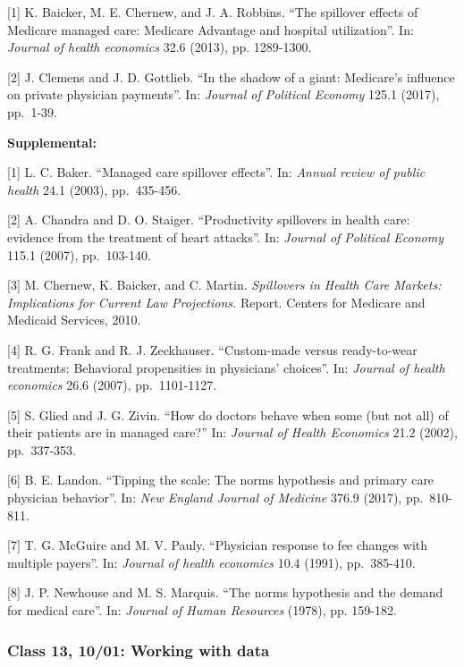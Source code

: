 \documentclass[11pt,]{article}
\begin{document}
{[}1{]} K. Baicker, M. E. Chernew, and J. A. Robbins. ``The spillover
effects of Medicare managed care: Medicare Advantage and hospital
utilization''. In: \emph{Journal of health economics} 32.6 (2013), pp.
1289-1300.

{[}2{]} J. Clemens and J. D. Gottlieb. ``In the shadow of a giant:
Medicare's influence on private physician payments''. In: \emph{Journal
of Political Economy} 125.1 (2017), pp.~1-39.

\textbf{Supplemental:}

{[}1{]} L. C. Baker. ``Managed care spillover effects''. In:
\emph{Annual review of public health} 24.1 (2003), pp.~435-456.

{[}2{]} A. Chandra and D. O. Staiger. ``Productivity spillovers in
health care: evidence from the treatment of heart attacks''. In:
\emph{Journal of Political Economy} 115.1 (2007), pp.~103-140.

{[}3{]} M. Chernew, K. Baicker, and C. Martin. \emph{Spillovers in
Health Care Markets: Implications for Current Law Projections.} Report.
Centers for Medicare and Medicaid Services, 2010.

{[}4{]} R. G. Frank and R. J. Zeckhauser. ``Custom-made versus
ready-to-wear treatments: Behavioral propensities in physicians'
choices''. In: \emph{Journal of health economics} 26.6 (2007),
pp.~1101-1127.

{[}5{]} S. Glied and J. G. Zivin. ``How do doctors behave when some (but
not all) of their patients are in managed care?'' In: \emph{Journal of
Health Economics} 21.2 (2002), pp.~337-353.

{[}6{]} B. E. Landon. ``Tipping the scale: The norms hypothesis and
primary care physician behavior''. In: \emph{New England Journal of
Medicine} 376.9 (2017), pp.~810-811.

{[}7{]} T. G. McGuire and M. V. Pauly. ``Physician response to fee
changes with multiple payers''. In: \emph{Journal of health economics}
10.4 (1991), pp.~385-410.

{[}8{]} J. P. Newhouse and M. S. Marquis. ``The norms hypothesis and the
demand for medical care''. In: \emph{Journal of Human Resources} (1978),
pp. 159-182.

\hypertarget{class-13-1001-working-with-data}{%
\subsubsection{Class 13, 10/01: Working with
data}\label{class-13-1001-working-with-data}}
\end{document}
